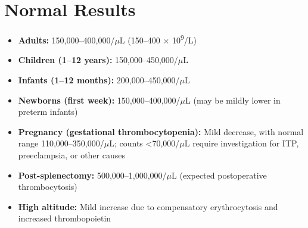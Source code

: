 \section*{Normal Results}
\begin{itemize}
  \item \textbf{Adults:} 150,000--400,000/$\mu$L (150--400 $\times$ 10\textsuperscript{9}/L)
  \item \textbf{Children (1--12 years):} 150,000--450,000/$\mu$L
  \item \textbf{Infants (1--12 months):} 200,000--450,000/$\mu$L
  \item \textbf{Newborns (first week):} 150,000--400,000/$\mu$L (may be mildly lower in preterm infants)
  \item \textbf{Pregnancy (gestational thrombocytopenia):} Mild decrease, with normal range 110,000--350,000/$\mu$L; counts <70,000/$\mu$L require investigation for ITP, preeclampsia, or other causes
  \item \textbf{Post-splenectomy:} 500,000--1,000,000/$\mu$L (expected postoperative thrombocytosis)
  \item \textbf{High altitude:} Mild increase due to compensatory erythrocytosis and increased thrombopoietin
\end{itemize}

